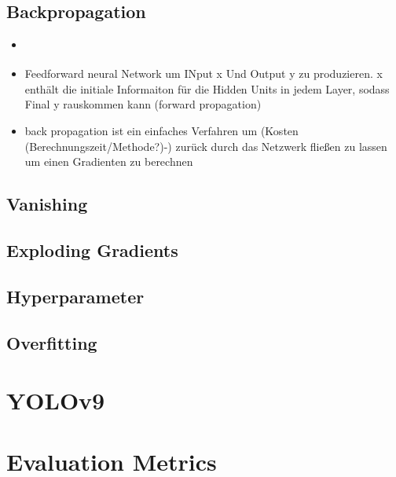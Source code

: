 \begin{itemize}
\end{itemize}
\subsection{Backpropagation}
\begin{itemize}
    \item \cite{Goodfellow-et-al-2016}
    \item Feedforward neural Network um INput x Und Output y zu produzieren. x enthält die initiale Informaiton für die Hidden Units in jedem Layer, sodass Final y rauskommen kann (forward propagation)
    \item back propagation ist ein einfaches Verfahren um (Kosten (Berechnungszeit/Methode?)-) zurück durch das Netzwerk fließen zu lassen um einen Gradienten zu berechnen
\end{itemize}
\subsection{Vanishing}
\subsection{Exploding Gradients}
\subsection{Hyperparameter}
\subsection{Overfitting}







\section{YOLOv9}

\section{Evaluation Metrics}
